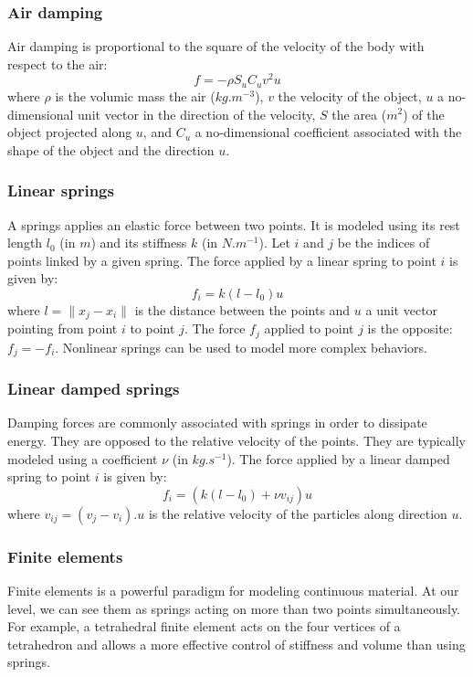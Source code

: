 \subsubsection{Air damping}
Air damping is proportional to the square of the velocity of the body with respect to the air:
\begin{equation}
f = -\rho S_u C_u v^2 u 
\end{equation}
where $\rho$ is the volumic mass the air ($kg.m^{-3}$), $v$ the velocity of the object, $u$ a no-dimensional unit vector in the direction of the velocity, $S$ the area ($m^2$) of the object projected along $u$, and $C_u$ a no-dimensional coefficient associated with the shape of the object and the direction $u$.

\subsubsection{Linear springs}
A springs applies an elastic force between two points. It is modeled using its rest length $l_0$ (in $m$) and its stiffness $k$ (in $N.m^{-1}$). 
Let $i$ and $j$ be the indices of points linked by a given spring. 
The force applied by a linear spring to point $i$ is given by:
\begin{equation}
\label{eq:spring}
f_i = k( l-l_0 ) u
\end{equation}
where $l=\|x_j - x_i\|$ is the distance between the points and $u$ a unit vector pointing from point $i$ to point $j$. The force $f_j$ applied to point $j$ is the opposite: $f_j = -f_i$. Nonlinear springs can be used to model more complex behaviors.

\subsubsection{Linear damped springs}
Damping forces are commonly associated with springs in order to dissipate energy. They are opposed to the relative velocity of the points. They are typically modeled using a coefficient $\nu$ (in $kg.s^{-1}$).
The force applied by a linear damped spring to point $i$ is given by:
\begin{equation}
\label{eq:dampedspring}
f_i = \left( k( l-l_0 ) + \nu v_{ij} \right) u
\end{equation}
where $v_{ij} = (v_j-v_i).u$ is the relative velocity of the particles along direction $u$.

\subsubsection{Finite elements}
Finite elements is a powerful paradigm for modeling continuous material. At our level, we can see them as springs acting on more than two points simultaneously. For example, a tetrahedral finite element acts on the four vertices of a tetrahedron and allows a more effective control of stiffness and volume than using springs.


